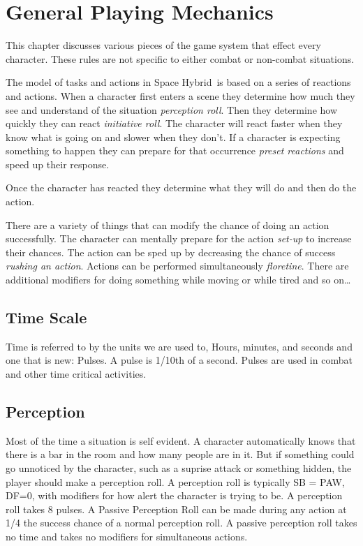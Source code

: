 \chapter{General Playing Mechanics}

This chapter discusses various pieces of the game system that effect 
every character. These rules are not specific to either combat or 
non-combat situations.  

The model of tasks and actions in Space Hybrid\ is based on a series of 
reactions and actions. When a character first enters a scene
they determine how much they see and understand of the situation {\em 
perception roll}. Then they determine how quickly they can react {\em 
initiative roll}. The character will react faster when they know what 
is going on and slower when they don't. If a character is expecting 
something to happen they can prepare for that occurrence {\em preset 
reactions} and speed up their response. 

Once the character has reacted they determine what they will do and then 
do the action. 

There are a variety of things that can modify the chance of doing an 
action successfully. The character can mentally prepare for the 
action {\em set-up} to increase their chances. The action can be sped 
up by decreasing the chance of success {\em rushing an action}. 
Actions can be performed simultaneously {\em floretine}. There are 
additional modifiers for doing something while moving or while tired 
and so on\dots

\section{Time Scale}

Time is referred to by the units we are used to, Hours, minutes, and seconds 
and one that is new: Pulses. A {pulse} is 1/10th of a second. Pulses are
used in combat and other time critical activities.

\section{Perception}

Most of the time a situation is self evident. A character automatically
knows that there is a bar in the room and how many people are in it.
But if something could go unnoticed by the character, such as a suprise 
attack or something hidden, the player should make a {perception roll}. 
A perception roll is typically SB = PAW, DF=0, with modifiers for 
how alert the character is trying to be. A perception roll takes
8 pulses. A {Passive Perception Roll} can be made 
during any action at 1/4 the success chance of a normal perception roll. A
passive perception roll takes no time and takes no modifiers for 
simultaneous actions.

